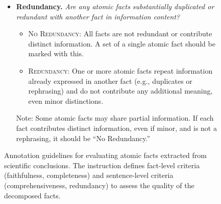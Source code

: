 \documentclass{article}
\begin{document}
\begin{figure}[h!]
\begin{small}
\begin{tcolorbox}[colback=gray!5, colframe=black, width=\textwidth, title=\textbf{Annotation Guideline for Evaluating Generated Atomic Facts}, fonttitle=\bfseries]
\begin{itemize}[leftmargin=0.6cm]
    \vspace{0.5em}
    \item \textbf{Redundancy.} \textit{Are any atomic facts substantially duplicated or redundant with another fact in information content?} 
     \vspace{-0.2em}
     \begin{itemize}[leftmargin=0.5cm]
    \item\textsc{No Redundancy:} All facts are not redundant or contribute distinct information. A set of a single atomic fact should be marked with this.
    \item\textsc{Redundancy:} One or more atomic facts repeat information already expressed in another fact (e.g., duplicates or rephrasing) and do not contribute any additional meaning, even minor distinctions.
    \end{itemize}
    \vspace{-0.2em}
    Note: Some atomic facts may share partial information. If each fact contributes distinct information, even if minor, and is not a rephrasing, it should be ``No Redundancy.'' 
\end{itemize}



\end{tcolorbox}
\caption{Annotation guidelines for evaluating atomic facts extracted from scientific conclusions. The instruction defines fact-level criteria (faithfulness, completeness) and sentence-level criteria (comprehensiveness, redundancy) to assess the quality of the decomposed facts.}
\label{fig:annotation-guidelines-atomic-facts}
\end{small}
\end{figure}


\clearpage
\end{document}
